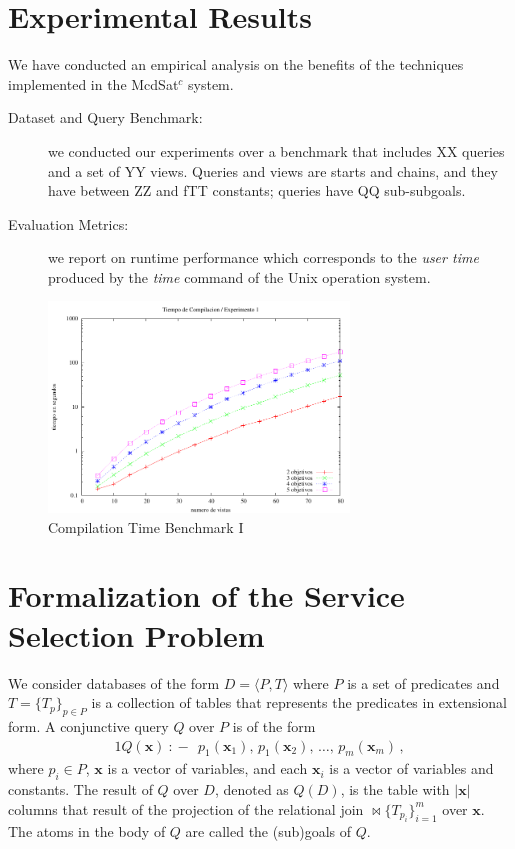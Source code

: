 \documentclass{llncs}
\newcommand{\tup}[1]{\langle #1 \rangle}
\newcommand{\vvec}[1]{\mathbf{#1}}
\newcommand{\join}{\bowtie}
\newcommand{\qrule}{:\!\!-}
\begin{document}
\section{Experimental Results}
We have conducted an empirical analysis  on the benefits of the techniques implemented in the   McdSat$^c$ system.

\begin{description}
\item[Dataset and Query Benchmark:]  we conducted our experiments over a benchmark that includes XX queries and a set of  YY views. Queries and views are starts and chains, and they have between ZZ and fTT constants; queries have QQ sub-subgoals.
\item[Evaluation Metrics:] we report on runtime performance which corresponds to the  {\it user time} produced by the {\it time} command of the Unix operation system. 
\end{description}
 
\begin{figure}
\centering
\includegraphics[width=8cm]{plot1.pdf}
\caption{Compilation Time Benchmark I}
\label{fig:plot1}
\end{figure}


\section{Formalization of the Service Selection Problem}

We consider databases of the form $D=\tup{P,T}$ where
$P$ is a set of predicates and $T=\{T_p\}_{p\in P}$ is a collection
of tables that represents the predicates in extensional form.
A conjunctive query $Q$ over $P$ is of the form 
\begin{alignat*}{1}
Q(\vvec{x})\ \qrule\ \  p_1(\vvec{x}_1),\, p_1(\vvec{x}_2),\, \ldots,\, p_m(\vvec{x}_m)\,,
\end{alignat*}
where $p_i\in P$, $\vvec{x}$ is a vector of variables, and each
$\vvec{x}_i$ is a vector of variables and constants.
The result of $Q$ over $D$, denoted as $Q(D)$, is the table with
$|\vvec{x}|$ columns that result of the projection of the relational
join $\join\!\!\{T_{p_i}\}_{i=1}^m$ over $\vvec{x}$.
The atoms in the body of $Q$ are called the (sub)goals of $Q$.
\end{document}
